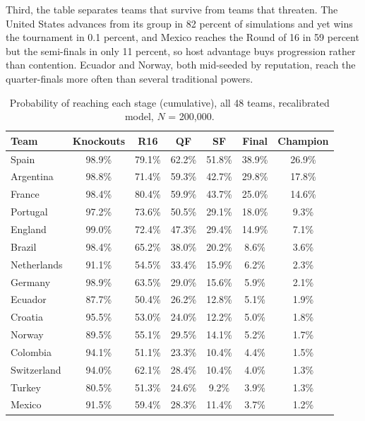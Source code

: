 \documentclass[11pt,letterpaper]{article}
\begin{document}
Third, the table separates teams that survive from teams that threaten. The United States advances from its group in 82 percent of simulations and yet wins the tournament in 0.1 percent, and Mexico reaches the Round of 16 in 59 percent but the semi-finals in only 11 percent, so host advantage buys progression rather than contention. Ecuador and Norway, both mid-seeded by reputation, reach the quarter-finals more often than several traditional powers.

\begin{table}[p]
\centering\footnotesize
\caption{Probability of reaching each stage (cumulative), all 48 teams, recalibrated model, $N$ = 200{,}000.}
\label{tab:survival}
\begin{tabular}{lcccccc}
\toprule
Team & Knockouts & R16 & QF & SF & Final & Champion \\
\midrule
Spain                  & 98.9\% & 79.1\% & 62.2\% & 51.8\% & 38.9\% & 26.9\% \\
Argentina              & 98.8\% & 71.4\% & 59.3\% & 42.7\% & 29.8\% & 17.8\% \\
France                 & 98.4\% & 80.4\% & 59.9\% & 43.7\% & 25.0\% & 14.6\% \\
Portugal               & 97.2\% & 73.6\% & 50.5\% & 29.1\% & 18.0\% &  9.3\% \\
England                & 99.0\% & 72.4\% & 47.3\% & 29.4\% & 14.9\% &  7.1\% \\
Brazil                 & 98.4\% & 65.2\% & 38.0\% & 20.2\% &  8.6\% &  3.6\% \\
Netherlands            & 91.1\% & 54.5\% & 33.4\% & 15.9\% &  6.2\% &  2.3\% \\
Germany                & 98.9\% & 63.5\% & 29.0\% & 15.6\% &  5.9\% &  2.1\% \\
Ecuador                & 87.7\% & 50.4\% & 26.2\% & 12.8\% &  5.1\% &  1.9\% \\
Croatia                & 95.5\% & 53.0\% & 24.0\% & 12.2\% &  5.0\% &  1.8\% \\
Norway                 & 89.5\% & 55.1\% & 29.5\% & 14.1\% &  5.2\% &  1.7\% \\
Colombia               & 94.1\% & 51.1\% & 23.3\% & 10.4\% &  4.4\% &  1.5\% \\
Switzerland            & 94.0\% & 62.1\% & 28.4\% & 10.4\% &  4.0\% &  1.3\% \\
Turkey                 & 80.5\% & 51.3\% & 24.6\% &  9.2\% &  3.9\% &  1.3\% \\
Mexico                 & 91.5\% & 59.4\% & 28.3\% & 11.4\% &  3.7\% &  1.2\% \\

\end{tabular}
\end{table}
\end{document}
